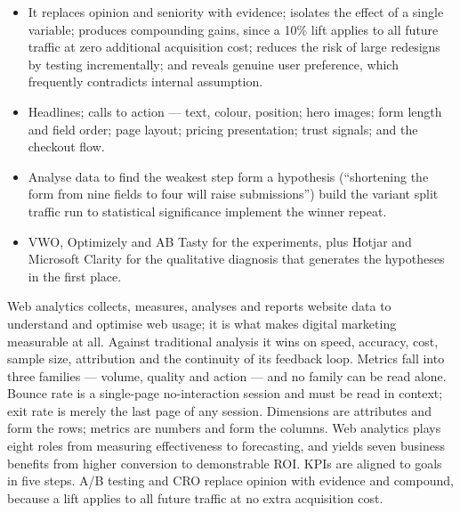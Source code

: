\documentclass{MMTextbook}
\begin{document}
\begin{itemize}
\item {} It replaces opinion and seniority with evidence;
      isolates the effect of a single variable; produces compounding gains, since
      a 10\% lift applies to all future traffic at zero additional acquisition
      cost; reduces the risk of large redesigns by testing incrementally; and
      reveals genuine user preference, which frequently contradicts internal
      assumption.
\item {} Headlines; calls to action --- text, colour, position;
      hero images; form length and field order; page layout; pricing
      presentation; trust signals; and the checkout flow.
\item {} Analyse data to find the weakest step \ra{} form a
      hypothesis (``shortening the form from nine fields to four will raise
      submissions'') \ra{} build the variant \ra{} split traffic \ra{} run to
      statistical significance \ra{} implement the winner \ra{} repeat.
\item {} VWO, Optimizely and AB Tasty for the experiments, plus Hotjar
      and Microsoft Clarity for the qualitative diagnosis that generates the
      hypotheses in the first place.
\end{itemize}

\begin{summarybox}
Web analytics collects, measures, analyses and reports website data to understand
and optimise web usage; it is what makes digital marketing measurable at all.
Against traditional analysis it wins on speed, accuracy, cost, sample size,
attribution and the continuity of its feedback loop. Metrics fall into three
families --- volume, quality and action --- and no family can be read alone.
Bounce rate is a single-page no-interaction session and must be read in context;
exit rate is merely the last page of any session. Dimensions are attributes and
form the rows; metrics are numbers and form the columns. Web analytics plays
eight roles from measuring effectiveness to forecasting, and yields seven
business benefits from higher conversion to demonstrable ROI. KPIs are aligned to
goals in five steps. A/B testing and CRO replace opinion with evidence and
compound, because a lift applies to all future traffic at no extra acquisition
cost.
\end{summarybox}

\end{document}
